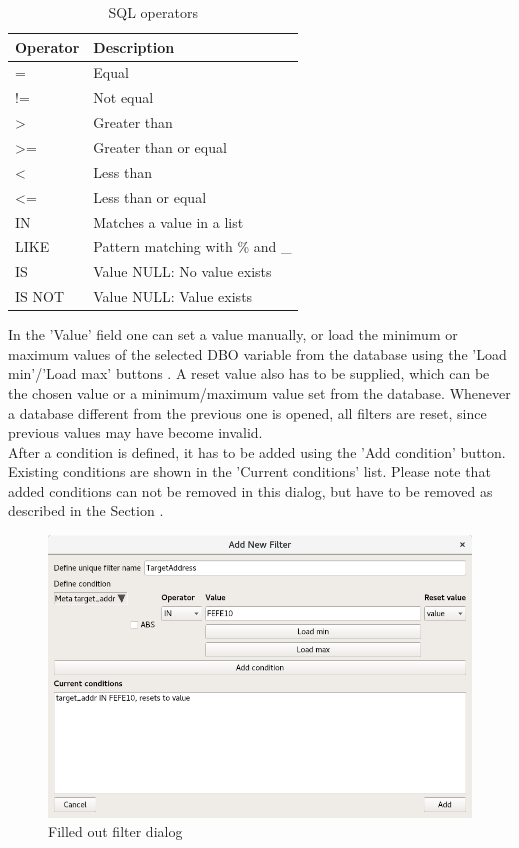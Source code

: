 \documentclass[10pt,letterpaper,extrafontsizes]{memoir}
\begin{document}
\begin{table}[H]
  \center
  \begin{tabular}{ | l | l |}
    \hline
    \textbf{Operator} & \textbf{Description} \\ \hline
    = & Equal \\ \hline
    != & Not equal \\ \hline
    > & Greater than \\ \hline
    >= & Greater than or equal \\ \hline
    < & Less than \\ \hline
    <= & Less than or equal \\ \hline
    IN & Matches a value in a list \\ \hline
    LIKE & Pattern matching with \% and \_ \\ \hline
    IS & Value NULL: No value exists \\ \hline
    IS NOT & Value NULL: Value exists \\
    \hline
  \end{tabular}
  \caption{SQL operators}
\end{table}

In the 'Value' field one can set a value manually, or load the minimum or maximum values of the selected DBO variable from the database using the 'Load min'/'Load max' buttons . A reset value also has to be supplied, which can be the chosen value or a minimum/maximum value set from the database.  Whenever a database different from the previous one is opened, all filters are reset, since previous values may have become invalid.\\

After a condition is defined, it has to be added using the 'Add condition' button. Existing conditions are
shown in the 'Current conditions' list. Please note that added conditions can not be removed in this dialog,
but have to be removed as described in the Section .

\begin{figure}[H]
  \center
    \includegraphics[width=14cm,frame]{../screenshots/filter_add2.png}
  \caption{Filled out filter dialog}
  \label{fig:filter_add2}
\end{figure}
\end{document}
